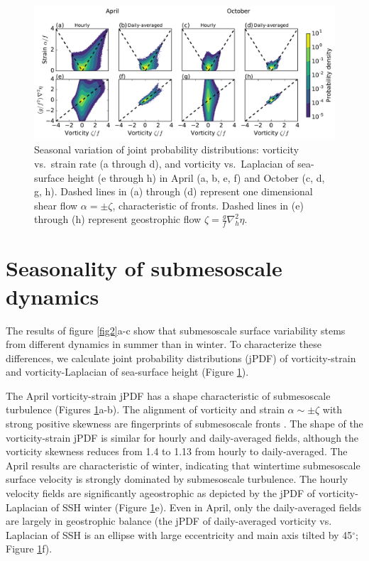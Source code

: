 \documentclass[grl]{agutex2015}
\begin{document}
\begin{article}
\begin{figure}[ht]
  \begin{center}
    \includegraphics[width=.95\textwidth]{figs/fig3.pdf}
 \caption{Seasonal variation of joint probability distributions:  vorticity vs.\ strain rate (a through d),
          and vorticity vs.\ Laplacian of sea-surface height (e through h) in April (a, b,
          e, f) and October (c, d, g, h).
          Dashed lines in (a) through (d) represent one dimensional shear flow $\alpha = \pm\zeta$,
          characteristic of fronts. Dashed lines in (e) through
          (h) represent geostrophic flow $\zeta = \frac{g}{f}\nabla_h^2 \eta$.}
 \label{fig3}
 \end{center}
\end{figure}

\section{Seasonality of submesoscale dynamics}
The results of figure \ref{fig2}a-c show that submesoscale surface
 variability stems from different dynamics in summer than in winter.
 To characterize these differences, we calculate
joint probability distributions (jPDF) of
vorticity-strain and vorticity-Laplacian of sea-surface height (Figure \ref{fig3}).

The April vorticity-strain jPDF has a shape characteristic of submesoscale turbulence
 (Figures \ref{fig3}a-b). The alignment of vorticity and strain $\alpha \sim \pm\zeta$
 with strong positive skewness are fingerprints of submesoscale fronts
 \citep{shcherbina_etal2013,mcwilliams2016}. The shape of the vorticity-strain
 jPDF is similar for hourly and daily-averaged fields, although
 the vorticity skewness reduces from 1.4 to 1.13 from hourly to daily-averaged.
 The April results are characteristic of winter, indicating that wintertime submesoscale
 surface velocity is strongly dominated by submesoscale turbulence.
 The hourly velocity fields are significantly
ageostrophic as depicted by the jPDF of vorticity-Laplacian of SSH
winter (Figure \ref{fig3}e). Even in April, only the daily-averaged fields
are largely
in  geostrophic balance (the jPDF of daily-averaged vorticity vs.\\ Laplacian of SSH
is an ellipse with large eccentricity and main axis tilted by 45$^\circ$; Figure \ref{fig3}f).


\end{article}
\end{document}

